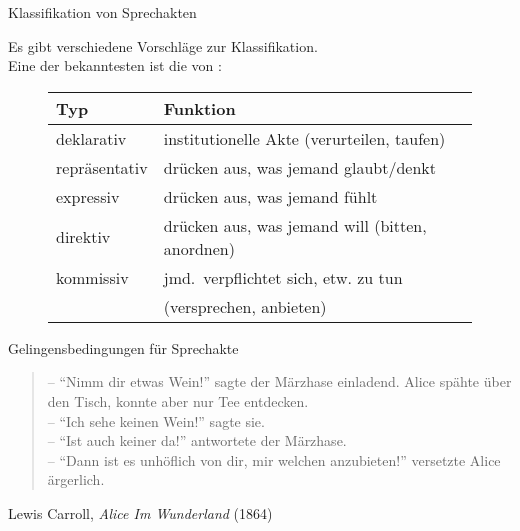 \begin{frame}{Klassifikation von Sprechakten}

Es gibt verschiedene Vorschläge zur Klassifikation.\\
 Eine der bekanntesten ist die von \cite{Searle1979}:

\begin{figure}
\begin{tabular}{p{}|p{}}
  \alert{Typ}   & \alert{Funktion}\\
\hline
  deklarativ    &  institutionelle Akte (verurteilen, taufen)\\
  repräsentativ & drücken aus, was jemand glaubt/denkt\\
  expressiv     & drücken aus, was jemand fühlt\\
  direktiv      & drücken aus, was jemand will (bitten, anordnen)\\
  kommissiv     & jmd.\ verpflichtet sich, etw. zu tun \\
                & (versprechen, anbieten)\\
\end{tabular}
\end{figure}

\end{frame}





\begin{frame}{Gelingensbedingungen für Sprechakte}
 \begin{quote} 
-- "`Nimm dir etwas Wein!"' sagte der Märzhase einladend. Alice spähte über den Tisch, konnte aber nur Tee entdecken.\\
-- "`Ich sehe keinen Wein!"' sagte sie.\\
-- "`Ist auch keiner da!"' antwortete der Märzhase.\\
-- "`Dann ist es unhöflich von dir, mir welchen anzubieten!"' versetzte Alice ärgerlich.\\
\end{quote}

{\small Lewis Carroll, \textit{Alice Im Wunderland} (1864)}
\end{frame}



